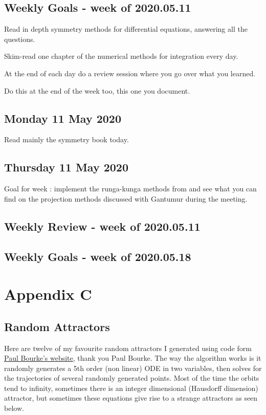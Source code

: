\documentclass[12pt]{article}
\begin{document}
\subsection{Weekly Goals - week of 2020.05.11}
Read in depth symmetry methods for differential equations, answering all the questions. 

Skim-read one chapter of the numerical methods for integration every day. 

At the end of each day do a review session where you go over what you learned. 

Do this at the end of the week too, this one you document. 

\subsection{Monday 11 May 2020}
Read mainly the symmetry book today. 

\subsection{Thursday 11 May 2020}
Goal for week : implement the runga-kunga methods from \cite{Duruisseaux} and see what you can find on the projection methods discussed with Gantumur during the meeting. 


\subsection{Weekly Review - week of 2020.05.11}

\subsection{Weekly Goals - week of 2020.05.18}

\section{Appendix C}\label{appendix c}
\subsection{Random Attractors}
Here are twelve of my favourite random attractors I generated using code form \href{http://paulbourke.net/fractals/lyapunov/}{Paul Bourke's website}, thank you Paul Bourke. The way the algorithm works is it randomly generates a 5th order (non linear) ODE in two variables, then solves for the trajectories of several randomly generated points. Most of the time the orbits tend to infinity, sometimes there is an integer dimensional (Hausdorff dimension) attractor, but sometimes these equations give rise to a strange attractors as seen below. 
\end{document}
